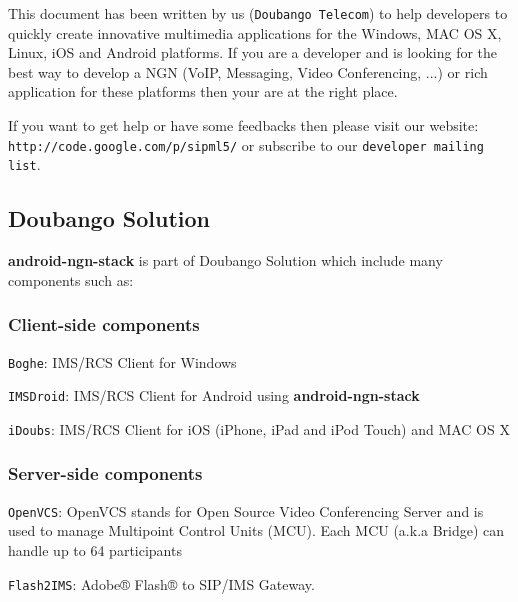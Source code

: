 This document has been written by us ({\tt Doubango Telecom}) to help developers to quickly create innovative multimedia applications for the Windows, M\-A\-C O\-S X, Linux, i\-O\-S and Android platforms. If you are a developer and is looking for the best way to develop a N\-G\-N (Vo\-I\-P, Messaging, Video Conferencing, ...) or rich application for these platforms then your are at the right place. \par
 If you want to get help or have some feedbacks then please visit our website\-: {\tt http\-://code.\-google.\-com/p/sipml5/} or subscribe to our {\tt developer mailing list}.

\subsection*{Doubango Solution}

{\bfseries android-\/ngn-\/stack} is part of Doubango Solution which include many components such as\-:

\subsubsection*{Client-\/side components}


\begin{DoxyItemize}
\item {\tt Boghe}\-: I\-M\-S/\-R\-C\-S Client for Windows
\item {\tt I\-M\-S\-Droid}\-: I\-M\-S/\-R\-C\-S Client for Android using {\bfseries android-\/ngn-\/stack}
\item {\tt i\-Doubs}\-: I\-M\-S/\-R\-C\-S Client for i\-O\-S (i\-Phone, i\-Pad and i\-Pod Touch) and M\-A\-C O\-S X
\end{DoxyItemize}

\subsubsection*{Server-\/side components}


\begin{DoxyItemize}
\item {\tt Open\-V\-C\-S}\-: Open\-V\-C\-S stands for Open Source Video Conferencing Server and is used to manage Multipoint Control Units (M\-C\-U). Each M\-C\-U (a.\-k.\-a Bridge) can handle up to 64 participants
\item {\tt Flash2\-I\-M\-S}\-: Adobe® Flash® to S\-I\-P/\-I\-M\-S Gateway. 
\end{DoxyItemize}
